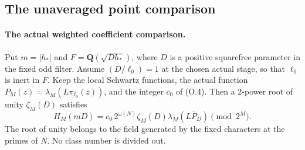 \subsection{The unaveraged point comparison}
\paragraph{The actual weighted coefficient comparison.}
\begin{proposition}
\label{ex:app-theta-comparison}
Put $m=|h_*|$ and $F=\mathbf Q(\sqrt{Dh_*})$, where $D$ is a
positive squarefree parameter in the fixed odd filter. Assume
$(D/\ell_0)=1$ at the chosen actual stage, so that $\ell_0$ is
inert in $F$. Keep the local Schwartz functions, the actual function
$P_M(z)=\lambda_M(L\pi_{\ell_0}(z))$, and the integer $c_0$
of (O.4). Then a $2$-power root of unity $\zeta_M(D)$ satisfies
\[
 H_M(mD)=c_0\,2^{\omega(N)}\zeta_M(D)
                   \lambda_M(\overline{LP_D})\pmod {2^M}.\tag{O.7}
\]
The root of unity belongs to the field generated by the fixed
characters at the primes of $N$. No class number is divided out.
\end{proposition}


